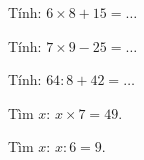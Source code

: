 \begin{ex}
Tính: $6 \times 8 + 15 = \dots$
\end{ex}

\begin{ex}
Tính: $7 \times 9 - 25 = \dots$
\end{ex}

\begin{ex}
Tính: $64 : 8 + 42 = \dots$
\end{ex}

\begin{ex}
Tìm $x$: $x \times 7 = 49$.
\end{ex}

\begin{ex}
Tìm $x$: $x : 6 = 9$.
\end{ex}
